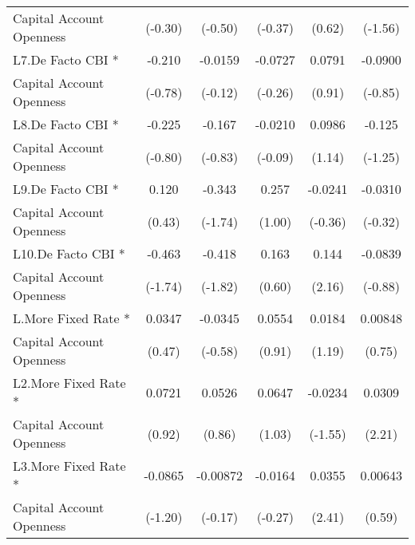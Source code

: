 {\begin{tabular}{l*{5}{c}}
Capital Account Openness&     (-0.30)         &     (-0.50)         &     (-0.37)         &      (0.62)         &     (-1.56)         \\
[1em]
L7.De Facto CBI *   &      -0.210         &     -0.0159         &     -0.0727         &      0.0791         &     -0.0900         \\
Capital Account Openness&     (-0.78)         &     (-0.12)         &     (-0.26)         &      (0.91)         &     (-0.85)         \\
[1em]
L8.De Facto CBI *   &      -0.225         &      -0.167         &     -0.0210         &      0.0986         &      -0.125         \\
Capital Account Openness&     (-0.80)         &     (-0.83)         &     (-0.09)         &      (1.14)         &     (-1.25)         \\
[1em]
L9.De Facto CBI *   &       0.120         &      -0.343         &       0.257         &     -0.0241         &     -0.0310         \\
Capital Account Openness&      (0.43)         &     (-1.74)         &      (1.00)         &     (-0.36)         &     (-0.32)         \\
[1em]
L10.De Facto CBI *  &      -0.463         &      -0.418         &       0.163         &       0.144\sym{*}  &     -0.0839         \\
Capital Account Openness&     (-1.74)         &     (-1.82)         &      (0.60)         &      (2.16)         &     (-0.88)         \\
[1em]
L.More Fixed Rate * &      0.0347         &     -0.0345         &      0.0554         &      0.0184         &     0.00848         \\
Capital Account Openness&      (0.47)         &     (-0.58)         &      (0.91)         &      (1.19)         &      (0.75)         \\
[1em]
L2.More Fixed Rate *&      0.0721         &      0.0526         &      0.0647         &     -0.0234         &      0.0309\sym{*}  \\
Capital Account Openness&      (0.92)         &      (0.86)         &      (1.03)         &     (-1.55)         &      (2.21)         \\
[1em]
L3.More Fixed Rate *&     -0.0865         &    -0.00872         &     -0.0164         &      0.0355\sym{*}  &     0.00643         \\
Capital Account Openness&     (-1.20)         &     (-0.17)         &     (-0.27)         &      (2.41)         &      (0.59)         \\

\end{tabular}}

